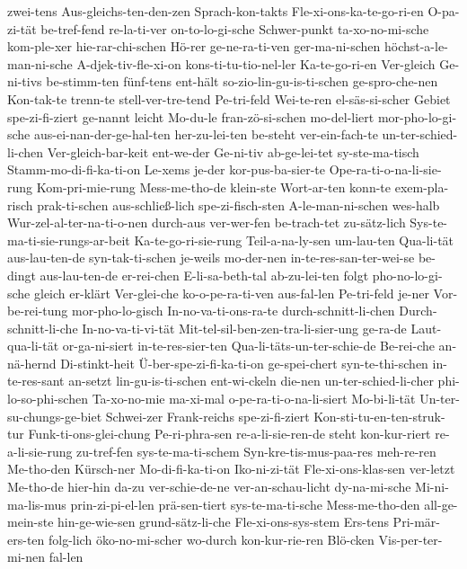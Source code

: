 {zwei-tens
Aus-gleichs-ten-den-zen
Sprach-kon-takts
Fle-xi-ons-ka-te-go-ri-en
O-pa-zi-tät
be-tref-fend
re-la-ti-ver
on-to-lo-gi-sche
Schwer-punkt
ta-xo-no-mi-sche
kom-ple-xer
hie-rar-chi-schen
Hö-rer
ge-ne-ra-ti-ven
ger-ma-ni-schen
höchst-a-le-man-ni-sche
A-djek-tiv-fle-xi-on
kons-ti-tu-tio-nel-ler
Ka-te-go-ri-en
Ver-gleich
Ge-ni-tivs
be-stimm-ten
fünf-tens
ent-hält
so-zio-lin-gu-is-ti-schen
ge-spro-che-nen
Kon-tak-te
trenn-te
stell-ver-tre-tend
Pe-tri-feld
Wei-te-ren
el-säs-si-scher
Gebiet
spe-zi-fi-ziert
ge-nannt
leicht
Mo-du-le
fran-zö-si-schen
mo-del-liert
mor-pho-lo-gi-sche
aus-ei-nan-der-ge-hal-ten
her-zu-lei-ten
be-steht
ver-ein-fach-te
un-ter-schied-li-chen
Ver-gleich-bar-keit
ent-we-der
Ge-ni-tiv
ab-ge-lei-tet
sy-ste-ma-tisch
Stamm-mo-di-fi-ka-ti-on
Le-xems
je-der
kor-pus-ba-sier-te
Ope-ra-ti-o-na-li-sie-rung
Kom-pri-mie-rung
Mess-me-tho-de
klein-ste
Wort-ar-ten
konn-te
exem-pla-risch
prak-ti-schen
aus-schließ-lich
spe-zi-fisch-sten
A-le-man-ni-schen
wes-halb
Wur-zel-al-ter-na-ti-o-nen
durch-aus
ver-wer-fen
be-trach-tet
zu-sätz-lich
Sys-te-ma-ti-sie-rungs-ar-beit
Ka-te-go-ri-sie-rung
Teil-a-na-ly-sen
um-lau-ten
Qua-li-tät
aus-lau-ten-de
syn-tak-ti-schen
je-weils
mo-der-nen
in-te-res-san-ter-wei-se
be-dingt
aus-lau-ten-de
er-rei-chen
E-li-sa-beth-tal
ab-zu-lei-ten
folgt
pho-no-lo-gi-sche
gleich
er-klärt
Ver-glei-che
ko-o-pe-ra-ti-ven
aus-fal-len
Pe-tri-feld
je-ner
Vor-be-rei-tung
mor-pho-lo-gisch
In-no-va-ti-ons-ra-te
durch-schnitt-li-chen
Durch-schnitt-li-che
In-no-va-ti-vi-tät
Mit-tel-sil-ben-zen-tra-li-sier-ung
ge-ra-de
Laut-qua-li-tät
or-ga-ni-siert
in-te-res-sier-ten
Qua-li-täts-un-ter-schie-de
Be-rei-che
an-nä-hernd
Di-stinkt-heit
Ü-ber-spe-zi-fi-ka-ti-on
ge-spei-chert
syn-te-thi-schen
in-te-res-sant
an-setzt
lin-gu-is-ti-schen
ent-wi-ckeln
die-nen
un-ter-schied-li-cher
phi-lo-so-phi-schen
Ta-xo-no-mie
ma-xi-mal
o-pe-ra-ti-o-na-li-siert
Mo-bi-li-tät
Un-ter-su-chungs-ge-biet
Schwei-zer
Frank-reichs
spe-zi-fi-ziert
Kon-sti-tu-en-ten-struk-tur
Funk-ti-ons-glei-chung
Pe-ri-phra-sen
re-a-li-sie-ren-de
steht
kon-kur-riert
re-a-li-sie-rung
zu-tref-fen
sys-te-ma-ti-schem
Syn-kre-tis-mus-paa-res
meh-re-ren
Me-tho-den
Kürsch-ner
Mo-di-fi-ka-ti-on
Iko-ni-zi-tät
Fle-xi-ons-klas-sen
ver-letzt
Me-tho-de
hier-hin
da-zu
ver-schie-de-ne
ver-an-schau-licht
dy-na-mi-sche
Mi-ni-ma-lis-mus
prin-zi-pi-el-len
prä-sen-tiert
sys-te-ma-ti-sche
Mess-me-tho-den
all-ge-mein-ste
hin-ge-wie-sen
grund-sätz-li-che
Fle-xi-ons-sys-stem
Ers-tens
Pri-mär-
ers-ten
folg-lich
öko-no-mi-scher
wo-durch
kon-kur-rie-ren
Blö-cken
Vis-per-ter-mi-nen
fal-len
}
